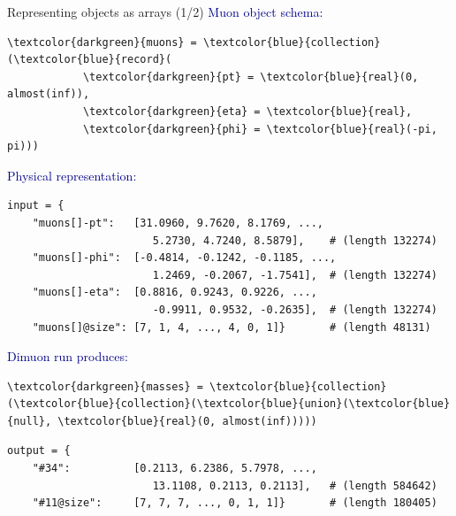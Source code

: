 \documentclass{beamer}
\begin{document}
\begin{frame}[fragile]{Representing objects as arrays (1/2)}
\vspace{0.3 cm}
\textcolor{darkblue}{\normalsize Muon object schema:}

\scriptsize
\begin{Verbatim}[commandchars=\\\{\}]
\textcolor{darkgreen}{muons} = \textcolor{blue}{collection}(\textcolor{blue}{record}(
            \textcolor{darkgreen}{pt} = \textcolor{blue}{real}(0, almost(inf)),
            \textcolor{darkgreen}{eta} = \textcolor{blue}{real},
            \textcolor{darkgreen}{phi} = \textcolor{blue}{real}(-pi, pi)))
\end{Verbatim}

\vspace{0.3 cm}
\textcolor{darkblue}{\normalsize Physical representation:}

\scriptsize
\begin{verbatim}
input = {
    "muons[]-pt":   [31.0960, 9.7620, 8.1769, ...,
                       5.2730, 4.7240, 8.5879],    # (length 132274)
    "muons[]-phi":  [-0.4814, -0.1242, -0.1185, ...,
                       1.2469, -0.2067, -1.7541],  # (length 132274)
    "muons[]-eta":  [0.8816, 0.9243, 0.9226, ...,
                       -0.9911, 0.9532, -0.2635],  # (length 132274)
    "muons[]@size": [7, 1, 4, ..., 4, 0, 1]}       # (length 48131)
\end{verbatim}

\vspace{0.3 cm}
\textcolor{darkblue}{\normalsize Dimuon run produces:}

\scriptsize
\begin{Verbatim}[commandchars=\\\{\}]
\textcolor{darkgreen}{masses} = \textcolor{blue}{collection}(\textcolor{blue}{collection}(\textcolor{blue}{union}(\textcolor{blue}{null}, \textcolor{blue}{real}(0, almost(inf)))))
\end{Verbatim}

\scriptsize
\begin{verbatim}
output = {
    "#34":          [0.2113, 6.2386, 5.7978, ...,
                       13.1108, 0.2113, 0.2113],   # (length 584642)
    "#11@size":     [7, 7, 7, ..., 0, 1, 1]}       # (length 180405)
\end{verbatim}
\end{frame}
\end{document}
